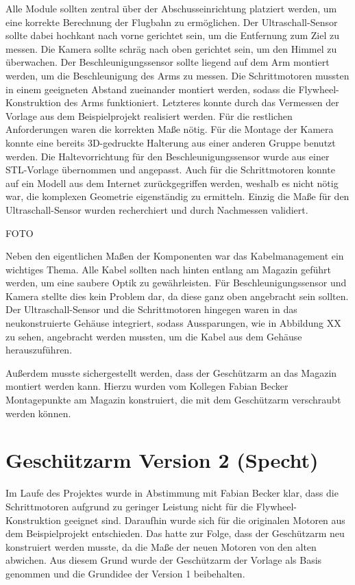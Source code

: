 Alle Module sollten zentral über der Abschusseinrichtung platziert werden, um eine korrekte Berechnung der Flugbahn zu ermöglichen. Der Ultraschall-Sensor sollte dabei hochkant nach vorne gerichtet sein, um die Entfernung zum Ziel zu messen. Die Kamera sollte schräg nach oben gerichtet sein, um den Himmel zu überwachen. Der Beschleunigungssensor sollte liegend auf dem Arm montiert werden, um die Beschleunigung des Arms zu messen. Die Schrittmotoren mussten in einem geeigneten Abstand zueinander montiert werden, sodass die Flywheel-Konstruktion des Arms funktioniert. Letzteres konnte durch das Vermessen der Vorlage aus dem Beispielprojekt realisiert werden. Für die restlichen Anforderungen waren die korrekten Maße nötig. Für die Montage der Kamera konnte eine bereits 3D-gedruckte Halterung aus einer anderen Gruppe benutzt werden. Die Haltevorrichtung für den Beschleunigungssensor wurde aus einer STL-Vorlage übernommen und angepasst. Auch für die Schrittmotoren konnte auf ein Modell aus dem Internet zurückgegriffen werden, weshalb es nicht nötig war, die komplexen Geometrie eigenständig zu ermitteln. Einzig die Maße für den Ultraschall-Sensor wurden recherchiert und durch Nachmessen validiert.

FOTO

Neben den eigentlichen Maßen der Komponenten war das Kabelmanagement ein wichtiges Thema. Alle Kabel sollten nach hinten entlang am Magazin geführt werden, um eine saubere Optik zu gewährleisten. Für Beschleunigungssensor und Kamera stellte dies kein Problem dar, da diese ganz oben angebracht sein sollten. Der Ultraschall-Sensor und die Schrittmotoren hingegen waren in das neukonstruierte Gehäuse integriert, sodass Aussparungen, wie in Abbildung XX zu sehen, angebracht werden mussten, um die Kabel aus dem Gehäuse herauszuführen.

Außerdem musste sichergestellt werden, dass der Geschützarm an das Magazin montiert werden kann. Hierzu wurden vom Kollegen Fabian Becker Montagepunkte am Magazin konstruiert, die mit dem Geschützarm verschraubt werden können.

\section{Geschützarm Version 2 (Specht)}

Im Laufe des Projektes wurde in Abstimmung mit Fabian Becker klar, dass die Schrittmotoren aufgrund zu geringer Leistung nicht für die Flywheel-Konstruktion geeignet sind. Daraufhin wurde sich für die originalen Motoren aus dem Beispielprojekt entschieden. Das hatte zur Folge, dass der Geschützarm neu konstruiert werden musste, da die Maße der neuen Motoren von den alten abwichen. Aus diesem Grund wurde der Geschützarm der Vorlage als Basis genommen und die Grundidee der Version 1 beibehalten.

